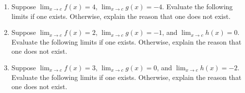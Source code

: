 \documentclass[11pt]{book}
\theoremstyle{break}
\theoremstyle{no_label}
\numberwithin{equation}{section}
\begin{document}
\begin{enumerate}[label=\arabic*.]
    \item Suppose $\displaystyle\lim_{x\to c}f(x)=4$, $\displaystyle\lim_{x\to c}g(x)=-4$. Evaluate the following limits if one exists. Otherwise, explain the reason that one does not exist.
    \begin{enumerate}
    \end{enumerate}
    \item Suppose $\displaystyle\lim_{x\to c}f(x)=2$, $\displaystyle\lim_{x\to c}g(x)=-1$, and $\displaystyle\lim_{x\to c}h(x)=0$. Evaluate the following limits if one exists. Otherwise, explain the reason that one does not exist.
    \begin{enumerate}
    \end{enumerate}
    \item Suppose $\displaystyle\lim_{x\to c}f(x)=3$, $\displaystyle\lim_{x\to c}g(x)=0$, and $\displaystyle\lim_{x\to c}h(x)=-2$. Evaluate the following limits if one exists. Otherwise, explain the reason that one does not exist.
    \begin{enumerate}
\end{enumerate}
\end{enumerate}
\end{document}
